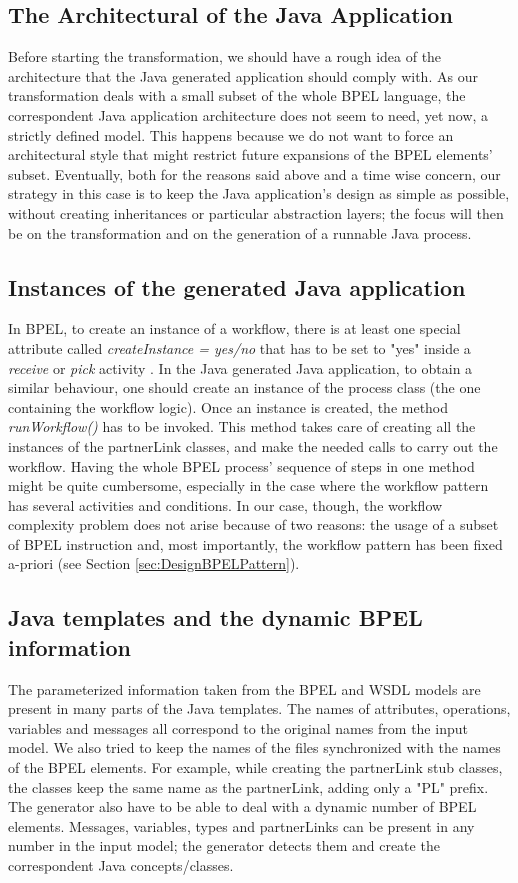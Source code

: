 \subsection{The Architectural of the Java Application}
\label{sec:JavaArchitecStruct}
Before starting the transformation, we should have a rough idea of the architecture that the Java generated application should comply with.
As our transformation deals with a small subset of the whole BPEL language, the correspondent Java application architecture does not seem to need, yet now, a strictly defined model. This happens because we do not want to force an architectural style that might restrict future expansions of the BPEL elements' subset.
Eventually, both for the reasons said above and a time wise concern, our strategy in this case is to keep the Java application's design as simple as possible, without creating inheritances or particular abstraction layers; the focus will then be on the transformation and on the generation of a runnable Java process.

\subsection{Instances of the generated Java application}
\label{sec:JavaAppRunnable}
In BPEL, to create an instance of a workflow, there is at least one special attribute called \textit{createInstance = yes/no} that has to be set to "yes" inside a \textit{receive} or \textit{pick} activity \cite{BPEL-oasis}. In the Java generated Java application, to obtain a similar behaviour, one should create an instance of the process class (the one containing the workflow logic). Once an instance is created, the method \textit{runWorkflow()} has to be invoked. This method takes care of creating all the instances of the partnerLink classes, and make the needed calls to carry out the workflow.
Having the whole BPEL process' sequence of steps in one method might be quite cumbersome, especially in the case where the workflow pattern has several activities and conditions. In our case, though, the workflow complexity problem does not arise because of two reasons: the usage of a subset of BPEL instruction and, most importantly, the workflow pattern has been fixed a-priori (see Section \ref{sec:DesignBPELPattern}). 

\subsection{Java templates and the dynamic BPEL information}
\label{TemplatesDynamicInfos}
The parameterized information taken from the BPEL and WSDL models are present in many parts of the Java templates. The names of attributes, operations, variables and messages all correspond to the original names from the input model. 
We also tried to keep the names of the files synchronized with the names of the BPEL elements. For example, while creating the partnerLink stub classes, the classes keep the same name as the partnerLink, adding only a "PL" prefix. 
The generator also have to be able to deal with a dynamic number of BPEL elements. Messages, variables, types and  partnerLinks can be present in any number in the input model; the generator detects them and create the correspondent Java concepts/classes.

